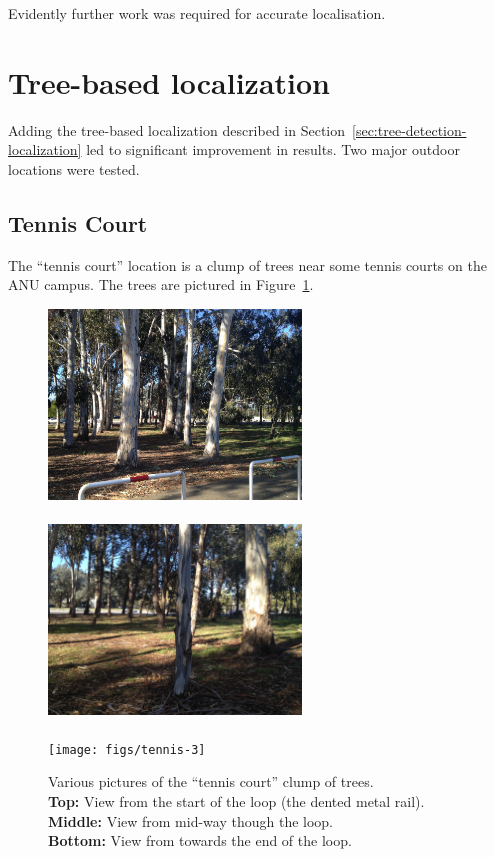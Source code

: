 \documentclass[12pt,oneside,a4paper]{book}
\begin{document}
Evidently further work was required for accurate localisation.

\section{Tree-based localization}
\label{sec:tree-based-local}

Adding the tree-based localization described in
Section~\ref{sec:tree-detection-localization} led to significant
improvement in results. Two major outdoor locations were tested.

\subsection{Tennis Court}
\label{sec:tennis-court}

The ``tennis court'' location is a clump of trees near some tennis
courts on the ANU campus. The trees are pictured in
Figure~\ref{fig:tennis-trees}.

\begin{figure}
  \centering
  \includegraphics[width=0.6\textwidth]{figs/tennis-1}\\
  ~\\
  \includegraphics[width=0.6\textwidth]{figs/tennis-2}\\
  ~\\
  \texttt{[image: figs/tennis-3]}\\
  \caption{Various pictures of the ``tennis court'' clump of trees.\\
  \textbf{Top:} View from the start of the loop (the dented metal
  rail).\\
  \textbf{Middle:} View from mid-way though the loop.\\
  \textbf{Bottom:} View from towards the end of the loop.}
  \label{fig:tennis-trees}
\end{figure}
\end{document}
